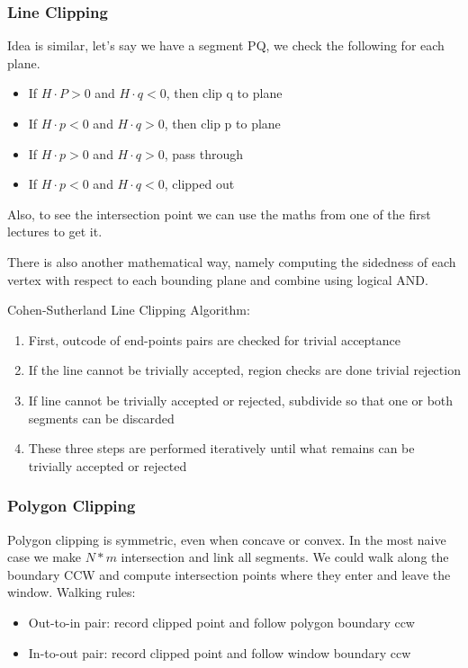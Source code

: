 \documentclass[11pt]{article}
\begin{document}
\subsubsection*{Line Clipping}
Idea is similar, let's say we have a segment PQ, we check the following for each plane.

\begin{itemize}
    \item If $H\cdot P > 0$ and $ H\cdot q < 0$, then clip q to plane
    \item If $H\cdot p < 0$ and $H \cdot q > 0$, then clip p to plane
    \item If $H\cdot p > 0$ and $H \cdot q > 0$, pass through
    \item If $H\cdot p < 0$ and $H \cdot q < 0$, clipped out         
\end{itemize}

Also, to see the intersection point we can use the maths from one of the first lectures to get it.

There is also another mathematical way, namely computing the sidedness of each vertex with respect to each bounding plane and combine using logical AND. 

Cohen-Sutherland Line Clipping Algorithm:
\begin{enumerate}
    \item First, outcode of end-points pairs are checked for trivial acceptance
    \item If the line cannot be trivially accepted, region checks are done trivial rejection
    \item If line cannot be trivially accepted or rejected, subdivide so that one or both segments can be discarded
    \item These three steps are performed iteratively until what remains can be trivially accepted or rejected
\end{enumerate}


\subsubsection*{Polygon Clipping}
Polygon clipping is symmetric, even when concave or convex. In the most naive case we make $N*m$ intersection and link all segments. We could walk along the boundary CCW and compute intersection points where they enter and leave the window.
\newline
Walking rules: 
\begin{itemize}
    \item Out-to-in pair: record clipped point and follow polygon boundary ccw
    \item In-to-out pair: record clipped point and follow window boundary ccw
\end{itemize}
\end{document}
